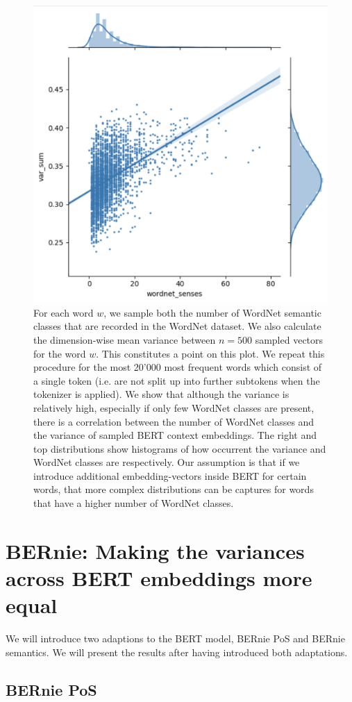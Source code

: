 \documentclass[a4paper,12pt,twoside,openright]{report}
\begin{document}
\begin{figure}[H]
	\center
  \includegraphics[width=0.5\linewidth]{./assets/experiments/variance_in_BERT_embeddings.png}
  \caption{
  	For each word $w$, we sample both the number of WordNet semantic classes that are recorded in the WordNet dataset. We also calculate the dimension-wise mean variance between $n=500$ sampled vectors for the word $w$. 
  	This constitutes a point on this plot.
  	We repeat this procedure for the most 20'000 most frequent words which consist of a single token (i.e. are not split up into further subtokens when the tokenizer is applied).
	We show that although the variance is relatively high, especially if only few WordNet classes are present, there is a correlation between the number of WordNet classes and the variance of sampled BERT context embeddings.
	The right and top distributions show histograms of how occurrent the variance and WordNet classes are respectively.
	Our assumption is that if we introduce additional embedding-vectors inside BERT for certain words, that more complex distributions can be captures for words that have a higher number of WordNet classes.
  }
  \label{fig:BERT_variance}
\end{figure}

\section{BERnie: Making the variances across BERT embeddings more equal}

We will introduce two adaptions to the BERT model, BERnie PoS and BERnie semantics.
We will present the results after having introduced both adaptations.

\subsection{BERnie PoS} \label{bernie_pos}
\end{document}
